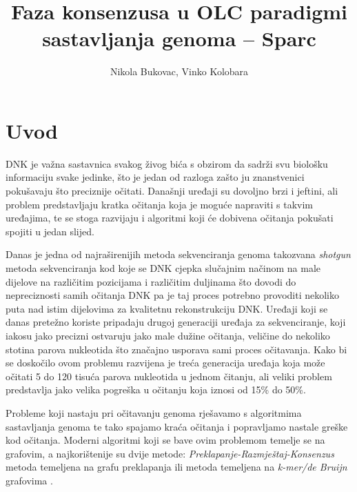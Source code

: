 \documentclass[times, utf8, seminar, numeric]{fer}
\begin{document}
\nocite{*}

\title{Faza konsenzusa u OLC paradigmi sastavljanja genoma – Sparc}

\author{Nikola Bukovac, Vinko Kolobara}


\maketitle

\tableofcontents

\chapter{Uvod}
DNK je važna sastavnica svakog živog bića s obzirom da sadrži svu biološku informaciju svake jedinke, što je jedan od razloga zašto ju znanstvenici pokušavaju što preciznije očitati. Današnji uređaji su dovoljno brzi i jeftini, ali problem predstavljaju kratka očitanja koja je moguće napraviti s takvim uređajima, te se stoga razvijaju i algoritmi koji će dobivena očitanja pokušati spojiti u jedan slijed.

Danas je jedna od najraširenijih metoda sekvenciranja genoma takozvana \emph{shotgun} metoda sekvenciranja kod koje se DNK cjepka slučajnim načinom na male dijelove na različitim pozicijama i različitim duljinama što dovodi do nepreciznosti samih očitanja DNK pa je taj proces potrebno provoditi nekoliko puta nad istim dijelovima za kvalitetnu rekonstrukciju DNK. Uređaji koji se danas pretežno koriste pripadaju drugoj generaciji uređaja za sekvenciranje, koji iakosu jako precizni ostvaruju jako male dužine očitanja, veličine do nekoliko stotina parova nukleotida što značajno usporava sami proces očitavanja. Kako bi se doskočilo ovom problemu razvijena je treća generacija uređaja koja može očitati 5 do 120 tisuća parova nukleotida u jednom čitanju, ali veliki problem predstavlja jako velika pogreška u očitanju koja iznosi od 15\% do 50\%.

Probleme koji nastaju pri očitavanju genoma rješavamo s algoritmima sastavljanja genoma te tako spajamo kraća očitanja i popravljamo nastale greške kod očitanja. Moderni algoritmi koji se bave ovim problemom temelje se na grafovim, a najkorištenije su dvije metode: \emph{Preklapanje-Razmještaj-Konsenzus} metoda temeljena na grafu preklapanja ili metoda temeljena na \emph{k-mer/de Bruijn} grafovima \cite{sikic2013bioinformatika}.
\end{document}
